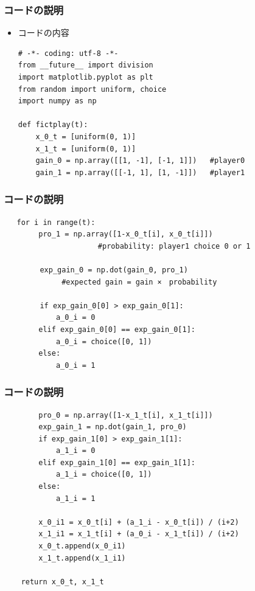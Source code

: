 \documentclass[dvipdfmx,fleqn,handout]{beamer}
\begin{document}
\begin{frame}[containsverbatim]%
\frametitle{コードの説明}
\begin{itemize}\setlength{\parskip}{0.5em}
\item
コードの内容
\begin{verbatim}
# -*- coding: utf-8 -*-
from __future__ import division  
import matplotlib.pyplot as plt
from random import uniform, choice
import numpy as np

def fictplay(t):
    x_0_t = [uniform(0, 1)]
    x_1_t = [uniform(0, 1)]
    gain_0 = np.array([[1, -1], [-1, 1]])   #player0
    gain_1 = np.array([[-1, 1], [1, -1]])   #player1
\end{verbatim}

\end{itemize}
\end{frame}

\begin{frame}[containsverbatim]%
\frametitle{コードの説明}
\begin{verbatim}
   for i in range(t):
        pro_1 = np.array([1-x_0_t[i], x_0_t[i]])      
		　　　　　　　  #probability: player1 choice 0 or 1
　　　　　　　　　
　　　　　exp_gain_0 = np.dot(gain_0, pro_1)            
　　　　　　　　#expected gain = gain ×　probability
        
　　　　　if exp_gain_0[0] > exp_gain_0[1]:
            a_0_i = 0
        elif exp_gain_0[0] == exp_gain_0[1]:
            a_0_i = choice([0, 1])
        else:
            a_0_i = 1

\end{verbatim}

\end{frame}

\begin{frame}[containsverbatim]%
\frametitle{コードの説明}
\begin{verbatim}
        pro_0 = np.array([1-x_1_t[i], x_1_t[i]])   
        exp_gain_1 = np.dot(gain_1, pro_0)
        if exp_gain_1[0] > exp_gain_1[1]:
            a_1_i = 0
        elif exp_gain_1[0] == exp_gain_1[1]:
            a_1_i = choice([0, 1])
        else:
            a_1_i = 1
        
        x_0_i1 = x_0_t[i] + (a_1_i - x_0_t[i]) / (i+2)
        x_1_i1 = x_1_t[i] + (a_0_i - x_1_t[i]) / (i+2)
        x_0_t.append(x_0_i1)
        x_1_t.append(x_1_i1)

    return x_0_t, x_1_t

\end{verbatim}

\end{frame}
\end{document}
